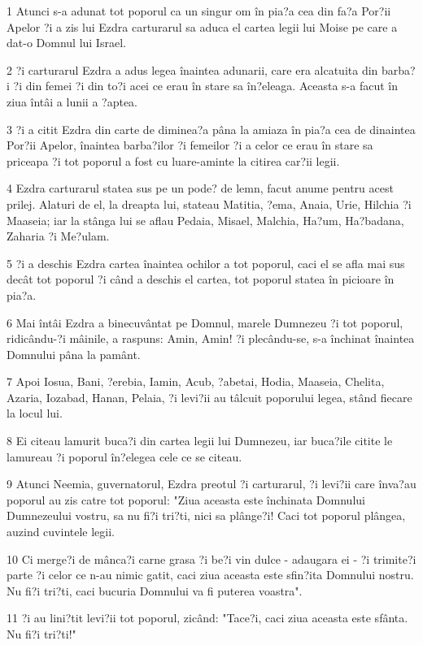 \par 1 Atunci s-a adunat tot poporul ca un singur om în pia?a cea din fa?a Por?ii Apelor ?i a zis lui Ezdra carturarul sa aduca el cartea legii lui Moise pe care a dat-o Domnul lui Israel.
\par 2 ?i carturarul Ezdra a adus legea înaintea adunarii, care era alcatuita din barba?i ?i din femei ?i din to?i acei ce erau în stare sa în?eleaga. Aceasta s-a facut în ziua întâi a lunii a ?aptea.
\par 3 ?i a citit Ezdra din carte de diminea?a pâna la amiaza în pia?a cea de dinaintea Por?ii Apelor, înaintea barba?ilor ?i femeilor ?i a celor ce erau în stare sa priceapa ?i tot poporul a fost cu luare-aminte la citirea car?ii legii.
\par 4 Ezdra carturarul statea sus pe un pode? de lemn, facut anume pentru acest prilej. Alaturi de el, la dreapta lui, stateau Matitia, ?ema, Anaia, Urie, Hilchia ?i Maaseia; iar la stânga lui se aflau Pedaia, Misael, Malchia, Ha?um, Ha?badana, Zaharia ?i Me?ulam.
\par 5 ?i a deschis Ezdra cartea înaintea ochilor a tot poporul, caci el se afla mai sus decât tot poporul ?i când a deschis el cartea, tot poporul statea în picioare în pia?a.
\par 6 Mai întâi Ezdra a binecuvântat pe Domnul, marele Dumnezeu ?i tot poporul, ridicându-?i mâinile, a raspuns: Amin, Amin! ?i plecându-se, s-a închinat înaintea Domnului pâna la pamânt.
\par 7 Apoi Iosua, Bani, ?erebia, Iamin, Acub, ?abetai, Hodia, Maaseia, Chelita, Azaria, Iozabad, Hanan, Pelaia, ?i levi?ii au tâlcuit poporului legea, stând fiecare la locul lui.
\par 8 Ei citeau lamurit buca?i din cartea legii lui Dumnezeu, iar buca?ile citite le lamureau ?i poporul în?elegea cele ce se citeau.
\par 9 Atunci Neemia, guvernatorul, Ezdra preotul ?i carturarul, ?i levi?ii care înva?au poporul au zis catre tot poporul: "Ziua aceasta este închinata Domnului Dumnezeului vostru, sa nu fi?i tri?ti, nici sa plânge?i! Caci tot poporul plângea, auzind cuvintele legii.
\par 10 Ci merge?i de mânca?i carne grasa ?i be?i vin dulce - adaugara ei - ?i trimite?i parte ?i celor ce n-au nimic gatit, caci ziua aceasta este sfin?ita Domnului nostru. Nu fi?i tri?ti, caci bucuria Domnului va fi puterea voastra".
\par 11 ?i au lini?tit levi?ii tot poporul, zicând: "Tace?i, caci ziua aceasta este sfânta. Nu fi?i tri?ti!"
